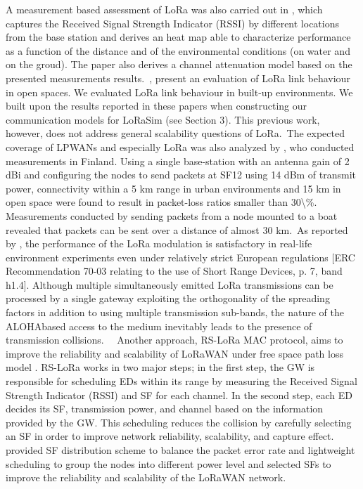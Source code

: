  \cite{petajajarvi_coverage_2015}   A measurement based assessment of LoRa was also carried out in \cite{petajajarvi_coverage_2015}, which captures the Received Signal Strength Indicator (RSSI) by different locations from the base station and derives an heat map able to characterize performance as a function of the distance and of the environmental conditions (on water and on the groud). The paper also derives a channel attenuation model based on the presented measurements results.~\citeauthor{petajajarvi_coverage_2015}, present an evaluation of LoRa link behaviour in open spaces. We evaluated LoRa link behaviour in built-up environments. We built upon the results reported in these papers when constructing our communication models for LoRaSim (see Section 3). This previous work, however, does not address general scalability questions of LoRa.~The expected coverage of LPWANs and especially LoRa was also analyzed by \citet{petajajarvi_coverage_2015}, who conducted measurements in Finland. Using a single base-station with an antenna gain of 2 dBi and configuring the nodes to send packets at SF12 using 14 dBm of transmit power, connectivity within a 5 km range in urban environments and 15 km in open space were found to result in packet-loss ratios smaller than 30\textbackslash\%. Measurements conducted by sending packets from a node mounted to a boat revealed that packets can be sent over a distance of almost 30 km.~As reported by \citet{petajajarvi_coverage_2015}, the performance of the LoRa \textregistered{} modulation is satisfactory in real-life environment experiments even under relatively strict European regulations [ERC Recommendation 70-03 relating to the use of Short Range Devices, p. 7, band h1.4]. Although multiple simultaneously emitted LoRa \textregistered{} transmissions can be processed by a single gateway exploiting the orthogonality of the spreading factors in addition to using multiple transmission sub-bands, the nature of the ALOHAbased access to the medium inevitably leads to the presence of transmission collisions.~~   \newline 
 \cite{reynders_improving_2018}   Another approach, RS-LoRa MAC protocol, aims to improve the reliability and scalability of LoRaWAN under free space path loss model \cite{reynders_improving_2018}. RS-LoRa works in two major steps; in the first step, the GW is responsible for scheduling EDs within its range by measuring the Received Signal Strength Indicator (RSSI) and SF for each channel. In the second step, each ED decides its SF, transmission power, and channel based on the information provided by the GW. This scheduling reduces the collision by carefully selecting an SF in order to improve network reliability, scalability, and capture effect.\citet{reynders_improving_2018} provided SF distribution scheme to balance the packet error rate \cite{reynders_power_2017} and lightweight scheduling to group the nodes into different power level and selected SFs to improve the reliability and scalability of the LoRaWAN network.   \newline 
